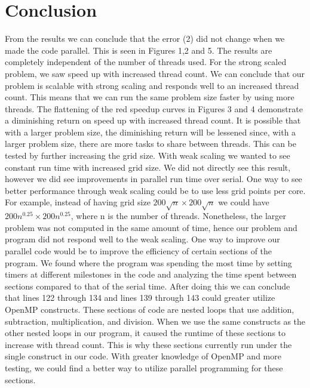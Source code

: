 \documentclass[12pt]{article}
\begin{document}
        \section{Conclusion}
    	From the results we can conclude that the error (2) did not change when we made the code parallel. This is seen in Figures 1,2 and 5. The results are completely independent of the number of threads used.
    	\newline \newline
    	 For the strong scaled problem, we saw speed up with increased thread count. We can conclude that our problem is scalable with strong scaling and responds well to an increased thread count. This means that we can run the same problem size faster by using more threads. The flattening of the red speedup curves in Figures 3 and 4 demonstrate a diminishing return on speed up with increased thread count. It is possible that with a larger problem size, the diminishing return will be lessened since, with a larger problem size, there are more tasks to share between threads. This can be tested by further increasing the grid size.
    	\newline \newline
    	With weak scaling we wanted to see constant run time with increased grid size. We did not directly see this result, however we did see improvements in parallel run time over serial. One way to see better performance through weak scaling could be to use less grid points per core. For example, instead of having grid size $200\sqrt{n}\times200\sqrt{n}$ we could have $200n^{0.25}\times200n^{0.25}$, where n is the number of threads. Nonetheless, the larger problem was not computed in the same amount of time, hence our problem and program did not respond well to the weak scaling.
    	\newline \newline
    	One way to improve our parallel code would be to improve the efficiency of certain sections of the program. We found where the program was spending the most time by setting timers at different milestones in the code and analyzing the time spent between sections compared to that of the serial time. After doing this we can conclude that lines 122 through 134 and lines 139 through 143 could greater utilize OpenMP constructs. These sections of code are nested loops that use addition, subtraction, multiplication, and division. When we use the same constructs as the other nested loops in our program, it caused the runtime of these sections to increase with thread count. This is why these sections currently run under the single construct in our code. With greater knowledge of OpenMP and more testing, we could find a better way to utilize parallel programming for these sections. 
\end{document}
